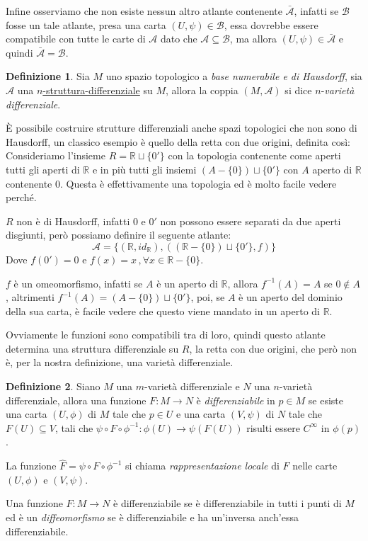 \documentclass[12pt, a4paper]{article}
\theoremstyle{definition}
\newtheorem{defi}{Definizione}
\begin{document}
Infine osserviamo che non esiste nessun altro atlante contenente $\mathcal{\bar{A}}$, infatti se $\mathcal{B}$ fosse un tale atlante, presa una carta $(U, \psi) \in \mathcal{B}$, essa
dovrebbe essere compatibile con tutte le carte di $\mathcal{A}$ dato che $\mathcal{A} \subseteq \mathcal{B}$, ma allora $(U, \psi) \in \mathcal{\bar{A}}$ e quindi $\mathcal{\bar{A}} = \mathcal{B}$.

\begin{defi} \label{def:varietà-differenziale}
Sia $M$ uno spazio topologico a \emph{base numerabile e di Hausdorff}, sia $\mathcal{A}$ una \hyperref[def:struttura-differenziale]{$n$-struttura-differenziale} su $M$, allora la coppia $(M, \mathcal{A})$
si dice $n$-\emph{varietà differenziale}.
\end{defi}

È possibile costruire strutture differenziali anche spazi topologici che non sono di Hausdorff, un classico esempio è quello della retta con due origini, definita così:
Consideriamo l'insieme $R = \mathbb{R} \sqcup \{0'\}$ con la topologia contenente come aperti tutti gli aperti di $\mathbb{R}$ e in più tutti gli insiemi $(A - \{0\}) \sqcup \{0'\}$
con $A$ aperto di $\mathbb{R}$ contenente $0$. Questa è effettivamente una topologia ed è molto facile vedere perché.

$R$ non è di Hausdorff, infatti $0$ e $0'$ non possono essere separati da due aperti disgiunti, però possiamo definire il seguente atlante:
$$\mathcal{A} = \{ (\mathbb{R}, id_{\mathbb{R}}), ((\mathbb{R} - \{0\}) \sqcup \{0'\}, f) \}$$
Dove $f(0') = 0$ e $f(x) = x\, ,\forall x \in \mathbb{R}-\{0\}$.

$f$ è un omeomorfismo, infatti se $A$ è un aperto di $\mathbb{R}$, allora $f^{-1}(A) = A$ se $0 \notin A$, altrimenti $f^{-1}(A) = (A - \{0\}) \sqcup \{0'\}$, poi, se $A$ è un aperto del dominio
della sua carta, è facile vedere che questo viene mandato in un aperto di $\mathbb{R}$.

Ovviamente le funzioni sono compatibili tra di loro, quindi questo atlante determina una struttura differenziale su $R$, la retta con due origini, che però non è, per la nostra definizione,
una varietà differenziale.

\begin{defi} \label{def:funzione-differenziabile}
Siano $M$ una $m$-varietà differenziale e $N$ una $n$-varietà differenziale, allora una funzione $F : M \to N$ è \emph{differenziabile} in $p \in M$ se esiste una carta $(U, \phi)$ di $M$
tale che $p \in U$ e una carta $(V, \psi)$ di $N$ tale che $F(U) \subseteq V$, tali che $\psi \circ F \circ \phi^{-1} : \phi(U) \to \psi(F(U))$ risulti essere $C^{\infty}$ in $\phi(p)$.

La funzione $\hat{F} = \psi \circ F \circ \phi^{-1}$ si chiama \emph{rappresentazione locale} di $F$ nelle carte $(U, \phi)$ e $(V, \psi)$.

Una funzione $F : M \to N$ è differenziabile se è differenziabile in tutti i punti di $M$ ed è un \emph{diffeomorfismo} se è differenziabile e ha un'inversa anch'essa differenziabile.
\end{defi}
\end{document}
